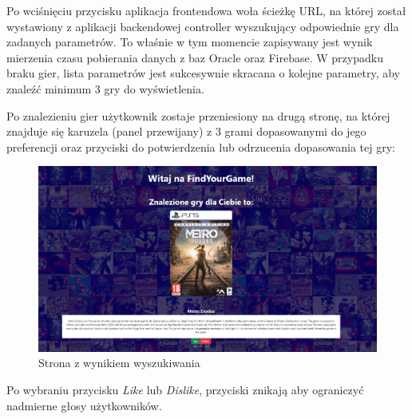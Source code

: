 Po wciśnięciu przycisku aplikacja frontendowa woła ścieżkę URL, na której został wystawiony z aplikacji backendowej controller wyszukujący odpowiednie gry dla zadanych parametrów. To właśnie w tym momencie zapisywany jest wynik mierzenia czasu pobierania danych z baz Oracle oraz Firebase. W przypadku braku gier, lista parametrów jest sukcesywnie skracana o kolejne parametry, aby znaleźć minimum 3 gry do wyświetlenia.

Po znalezieniu gier użytkownik zostaje przeniesiony na drugą stronę, na której znajduje się karuzela (panel przewijany) z 3 grami dopasowanymi do jego preferencji oraz przyciski do potwierdzenia lub odrzucenia dopasowania tej gry:
\begin{figure}[h]
    \centering
    \includegraphics[width=1\linewidth]{./img/secondpage.jpg}
    \caption{Strona z wynikiem wyszukiwania}
    \label{fig:StronaWynik}
\end{figure}
Po wybraniu przycisku \textit{Like} lub \textit{Dislike}, przyciski znikają aby ograniczyć nadmierne głosy użytkowników.